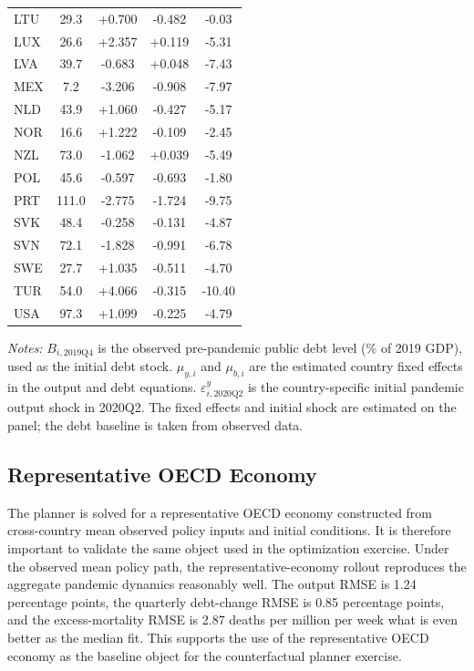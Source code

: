 \documentclass[12pt, a4paper]{article}
\begin{document}
\begin{table}[H]
\begin{tabular}{lcccc}
LTU & 29.3 & +0.700 & -0.482 & -0.03 \\
LUX & 26.6 & +2.357 & +0.119 & -5.31 \\
LVA & 39.7 & -0.683 & +0.048 & -7.43 \\
MEX & 7.2 & -3.206 & -0.908 & -7.97 \\
NLD & 43.9 & +1.060 & -0.427 & -5.17 \\
NOR & 16.6 & +1.222 & -0.109 & -2.45 \\
NZL & 73.0 & -1.062 & +0.039 & -5.49 \\
POL & 45.6 & -0.597 & -0.693 & -1.80 \\
PRT & 111.0 & -2.775 & -1.724 & -9.75 \\
SVK & 48.4 & -0.258 & -0.131 & -4.87 \\
SVN & 72.1 & -1.828 & -0.991 & -6.78 \\
SWE & 27.7 & +1.035 & -0.511 & -4.70 \\
TUR & 54.0 & +4.066 & -0.315 & -10.40 \\
USA & 97.3 & +1.099 & -0.225 & -4.79 \\
\bottomrule
\end{tabular}

\vspace{0.15cm}
\begin{minipage}{0.9\textwidth}
\scriptsize
\textit{Notes:} $B_{i,2019\text{Q}4}$ is the observed pre-pandemic public debt level (\% of 2019 GDP), used as the initial debt stock. $\mu_{y,i}$ and $\mu_{b,i}$ are the estimated country fixed effects in the output and debt equations. $\varepsilon^{y}_{i,2020\text{Q}2}$ is the country-specific initial pandemic output shock in 2020Q2. The fixed effects and initial shock are estimated on the panel; the debt baseline is taken from observed data.
\end{minipage}
\end{table}


\subsection{Representative OECD Economy}

The planner is solved for a representative OECD economy constructed from cross-country mean observed policy inputs and initial conditions. It is therefore important to validate the same object used in the optimization exercise. Under the observed mean policy path, the representative-economy rollout reproduces the aggregate pandemic dynamics reasonably well. The output RMSE is 1.24 percentage points, the quarterly debt-change RMSE is 0.85 percentage points, and the excess-mortality RMSE is 2.87 deaths per million per week what is even better as the median fit. This supports the use of the representative OECD economy as the baseline object for the counterfactual planner exercise.
\end{document}
